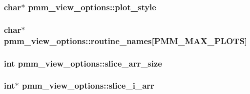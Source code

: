 \hypertarget{structpmm__view__options_a913a0d3e709b08130337dbf29eb300bb}{
\subsubsection[{plot\-\_\-style}]{\setlength{\rightskip}{0pt plus 5cm}char$\ast$ pmm\-\_\-view\-\_\-options\-::plot\-\_\-style}}\label{structpmm__view__options_a913a0d3e709b08130337dbf29eb300bb}
\hypertarget{structpmm__view__options_ad050b8ecaf9f39b1d392bf59e4630753}{
\subsubsection[{routine\-\_\-names}]{\setlength{\rightskip}{0pt plus 5cm}char$\ast$ pmm\-\_\-view\-\_\-options\-::routine\-\_\-names\mbox{[}{\bf P\-M\-M\-\_\-\-M\-A\-X\-\_\-\-P\-L\-O\-T\-S}\mbox{]}}}\label{structpmm__view__options_ad050b8ecaf9f39b1d392bf59e4630753}
\hypertarget{structpmm__view__options_a517a561755bbcf20141dbb262199ed76}{
\subsubsection[{slice\-\_\-arr\-\_\-size}]{\setlength{\rightskip}{0pt plus 5cm}int pmm\-\_\-view\-\_\-options\-::slice\-\_\-arr\-\_\-size}}\label{structpmm__view__options_a517a561755bbcf20141dbb262199ed76}
\hypertarget{structpmm__view__options_a14df900d0381d9b54dfb8adff694cdb6}{
\subsubsection[{slice\-\_\-i\-\_\-arr}]{\setlength{\rightskip}{0pt plus 5cm}int$\ast$ pmm\-\_\-view\-\_\-options\-::slice\-\_\-i\-\_\-arr}}\label{structpmm__view__options_a14df900d0381d9b54dfb8adff694cdb6}
